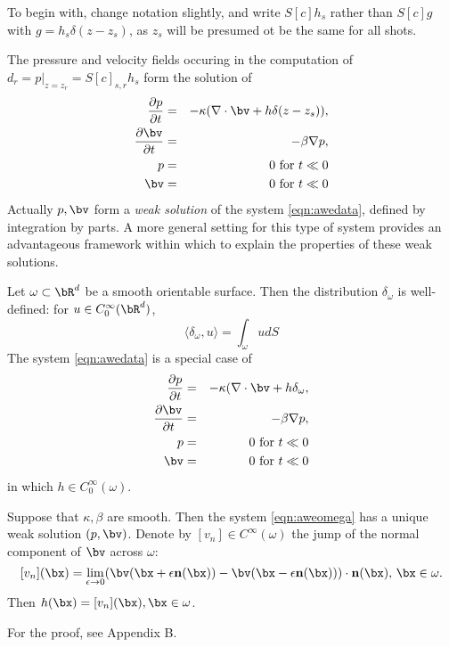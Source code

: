 To begin with, change notation slightly, and write $S[c]h_s$ rather than $S[c]g$ with $g = h_s \delta(z-z_s)$, as $z_s$ will be presumed ot be the same for all shots. 

The pressure and velocity fields occuring in the computation of $d_r=p|_{z=z_r}=S[c]_{s,r}h_s$ form the solution of
\begin{eqnarray}
\label{eqn:awedata}
\frac{\partial p}{\partial t} & = & - \kappa( \nabla \cdot \bv +
h \delta(z-z_s)), \nonumber \\
\frac{\partial \bv}{\partial t} & = & - \beta \nabla p,\nonumber \\
p & =& 0 \mbox{ for } t \ll 0 \nonumber\\ 
\bv & = & 0 \mbox{ for } t \ll 0 \nonumber\\
\end{eqnarray}
Actually $p,\bv$ form a {\em weak solution} of the system \ref{eqn:awedata}, defined by integration by parts. A more general setting for this type of system provides an advantageous framework within which to explain the properties of these weak solutions.

Let $\omega \subset \bR^d$ be a smooth orientable surface. Then the distribution $\delta_{\omega}$ is well-defined: for $u \in C_0^{\infty}(\bR^d)$, 
\[
\langle \delta_{\omega}, u \rangle = \int_{\omega} u dS
\]
The system \ref{eqn:awedata} is a special case of
\begin{eqnarray}
\label{eqn:aweomega}
\frac{\partial p}{\partial t} & = & - \kappa( \nabla \cdot \bv +
h \delta_{\omega}, \nonumber \\
\frac{\partial \bv}{\partial t} & = & - \beta \nabla p,\nonumber \\
p & =& 0 \mbox{ for } t \ll 0 \nonumber\\ 
\bv & = & 0 \mbox{ for } t \ll 0 \nonumber\\
\end{eqnarray}
in which $h \in C_0^{\infty}(\omega)$.

\begin{thm}
\label{thm:bvs}
Suppose that $\kappa,\beta$ are smooth. Then the system \ref{eqn:aweomega} has a unique weak solution $(p,\bv)$. Denote by $[v_n] \in C^{\infty}(\omega)$ the jump of the normal component of $\bv$ across $\omega$:
\[
[v_n](\bx) = \lim_{\epsilon \rightarrow 0} (\bv(\bx + \epsilon {\bf n}(\bx))-\bv(\bx - \epsilon {\bf n}(\bx)))\cdot {\bf n}(\bx),\,\bx \in \omega.
\]
Then $h(\bx) = [v_n](\bx), \bx \in \omega$.

\end{thm}
For the proof, see  Appendix B.

